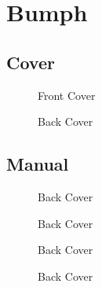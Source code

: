 \chapter{Bumph}

\section{Cover}
\begin{figure}[H]
  {
    \begin{adjustbox}{width=10cm,center}
    \end{adjustbox}
  }\caption[]{Front Cover}
\end{figure}

\begin{figure}[H]
  {
    \begin{adjustbox}{width=10cm,center}
    \end{adjustbox}
  }\caption[]{Back Cover}
\end{figure}

\section{Manual}

\begin{figure}[H]
  {
    \begin{adjustbox}{width=10cm,center}
    \end{adjustbox}
  }\caption[]{Back Cover}
\end{figure}

\begin{figure}[H]
  {
    \begin{adjustbox}{width=10cm,center}
    \end{adjustbox}
  }\caption[]{Back Cover}
\end{figure}

\begin{figure}[H]
  {
    \begin{adjustbox}{width=10cm,center}
    \end{adjustbox}
  }\caption[]{Back Cover}
\end{figure}

\begin{figure}[H]
  {
    \begin{adjustbox}{width=10cm,center}
    \end{adjustbox}
  }\caption[]{Back Cover}
\end{figure}

